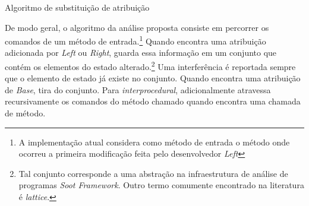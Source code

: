 \begin{algorithm}[h]
    \caption{Algoritmo de substituição de atribuição}
    

    
   
    
    \BlankLine
\end{algorithm}


De modo geral, o algoritmo da análise proposta consiste em percorrer os comandos de um método de entrada.\footnote{A implementação atual considera como método de entrada o método onde ocorreu a primeira modificação feita pelo desenvolvedor \emph{Left}} Quando encontra uma atribuição adicionada por \emph{Left} ou \emph{Right}, guarda essa informação em um conjunto que contém os elementos do estado alterado.\footnote{Tal conjunto corresponde a uma abstração na infraestrutura de análise de programas \emph{Soot Framework}. Outro termo comumente encontrado na literatura é \emph{lattice}.} Uma interferência é reportada sempre que o elemento de estado já existe no conjunto. Quando encontra uma atribuição de \emph{Base}, tira do conjunto. Para \emph{interprocedural}, adicionalmente atravessa recursivamente os comandos do método chamado quando encontra uma chamada de método.

